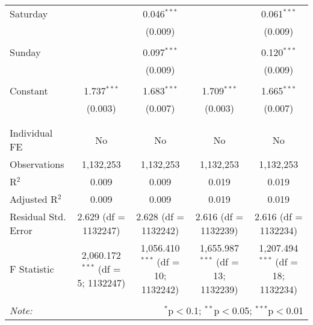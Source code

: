 \documentclass[
]{article}
\begin{document}
\begin{table}[!htbp]
{\begin{tabular}{@{\extracolsep{5pt}}lcccc}
 Saturday &  & 0.046$^{***}$ &  & 0.061$^{***}$ \\ 
  &  & (0.009) &  & (0.009) \\ 
  & & & & \\ 
 Sunday &  & 0.097$^{***}$ &  & 0.120$^{***}$ \\ 
  &  & (0.009) &  & (0.009) \\ 
  & & & & \\ 
 Constant & 1.737$^{***}$ & 1.683$^{***}$ & 1.709$^{***}$ & 1.665$^{***}$ \\ 
  & (0.003) & (0.007) & (0.003) & (0.007) \\ 
  & & & & \\ 
\hline \\[-1.8ex] 
Individual FE & No & No & No & No \\ 
Observations & 1,132,253 & 1,132,253 & 1,132,253 & 1,132,253 \\ 
R$^{2}$ & 0.009 & 0.009 & 0.019 & 0.019 \\ 
Adjusted R$^{2}$ & 0.009 & 0.009 & 0.019 & 0.019 \\ 
Residual Std. Error & 2.629 (df = 1132247) & 2.628 (df = 1132242) & 2.616 (df = 1132239) & 2.616 (df = 1132234) \\ 
F Statistic & 2,060.172$^{***}$ (df = 5; 1132247) & 1,056.410$^{***}$ (df = 10; 1132242) & 1,655.987$^{***}$ (df = 13; 1132239) & 1,207.494$^{***}$ (df = 18; 1132234) \\ 
\hline 
\hline \\[-1.8ex] 
\textit{Note:}  & \multicolumn{4}{r}{$^{*}$p$<$0.1; $^{**}$p$<$0.05; $^{***}$p$<$0.01} \\ 
\end{tabular}
} 
\end{table} 
\newpage
\end{document}
